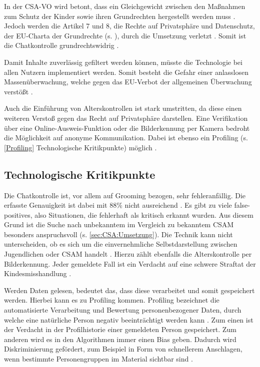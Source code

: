 In der \ac{CSA-VO} wird betont, dass ein Gleichgewicht zwischen den Maßnahmen zum Schutz der Kinder sowie ihren Grundrechten hergestellt werden muss \cite{csa_verordnung}. Jedoch werden die Artikel 7 und 8, die Rechte auf Privatsphäre und Datenschutz, der \ac{EU}-Charta der Grundrechte (s. \cite{eu_charta_der_grundrechte}), durch die Umsetzung verletzt \cite {DSK:2023:Brief, edri:2023, blacknightsolutions:2024}. Somit ist die Chatkontrolle grundrechtswidrig \cite{np:biselli:_2022}.

Damit Inhalte zuverlässig gefiltert werden können, müsste die Technologie bei allen Nutzern implementiert werden. Somit besteht die Gefahr einer anlasslosen Massenüberwachung, welche gegen das \ac{EU}-Verbot der allgemeinen Überwachung verstößt \cite{DSK:2023:Brief, edri:2023, np:meineck:2022}.

Auch die Einführung von Alterskontrollen ist stark umstritten, da diese einen weiteren Verstoß gegen das Recht auf Privatsphäre darstellen. Eine Verifikation über eine Online-Ausweis-Funktion oder die Bilderkennung per Kamera bedroht die Möglichkeit auf anonyme Kommunikation. Dabei ist ebenso ein Profiling (s. \autoref{Profiling} Technologische Kritikpunkte) möglich \cite{np:meineck:2022}.


\subsection*{Technologische Kritikpunkte}
\label{subsec:CSA:Kritik:technKritik}

Die Chatkontrolle ist, vor allem auf Grooming bezogen, sehr fehleranfällig. Die erfasste Genauigkeit ist dabei mit 88\% nicht ausreichend \cite{edri:2023, np:meineck:2022}. Es gibt zu viele \glq false-positives\grq{}, also Situationen, die fehlerhaft als kritisch erkannt wurden. Aus diesem Grund ist die Suche nach unbekanntem im Vergleich zu bekanntem \ac{CSAM} besonders anspruchsvoll \cite{np:meineck:2022} (s. \autoref{sec:CSA:Umsetzung}).
Die Technik kann nicht unterscheiden, ob es sich um die einvernehmliche Selbstdarstellung zwischen Jugendlichen oder \ac{CSAM} handelt \cite{edri:2023}. Hierzu zählt ebenfalls die Alterskontrolle per Bilderkennung. Jeder gemeldete Fall ist ein Verdacht auf eine schwere Straftat der Kindesmisshandlung \cite{np:meineck:2022}.

Werden Daten gelesen, bedeutet das, dass diese verarbeitet und somit gespeichert werden. Hierbei kann es zu Profiling kommen. Profiling bezeichnet die automatisierte Verarbeitung und Bewertung personenbezogener Daten, durch welche eine natürliche Person negativ beeinträchtigt werden kann \cite{dsgvo:profiling}. \label{Profiling} Zum einen ist der Verdacht in der Profilhistorie einer gemeldeten Person gespeichert. Zum anderen wird es in den Algorithmen immer einen Bias geben. Dadurch wird Diskriminierung gefördert, zum Beispiel in Form von schnellerem Anschlagen, wenn bestimmte Personengruppen im Material sichtbar sind \cite{np:meineck:2022}.

